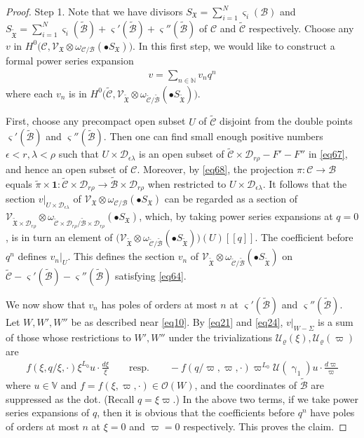 \documentclass[12pt,a4paper,notitlepage]{article}
\theoremstyle{definition}
\theoremstyle{plain}
\newcommand{\fk}{\mathfrak}
\newcommand{\mc}{\mathcal}
\newcommand{\wtd}{\widetilde}
\newcommand{\id}{\mathbf{1}}
\newcommand{\scr}{\mathscr}
\newcommand{\sgm}{\varsigma}
\newcommand{\blt}{\bullet}
\newcommand{\Vbb}{\mathbb V}
\newcommand{\Nbb}{\mathbb N}
\numberwithin{equation}{section}
\begin{document}
\begin{proof}
	Step 1. Note that we have divisors $S_{\fk X}=\sum_{i=1}^N\sgm_i(\mc B)$ and $S_{\wtd{\fk X}}=\sum_{i=1}^N\sgm_i(\wtd{\mc B})+\sgm'(\wtd{\mc B})+\sgm''(\wtd{\mc B})$ of $\mc C$ and $\wtd{\mc C}$ respectively. Choose any $v$ in $H^0\big(\mc C,\scr V_{\fk X}\otimes\omega_{\mc C/\mc B}(\blt S_{\fk X})\big)$.  In this first step, we would like to construct a formal power series expansion
	\begin{align}
	v=\sum_{n\in\Nbb}v_{n}q^n\label{eq64}
	\end{align}
	where each $v_{n}$ is in $H^0\big(\wtd{\mc C},\scr V_{\wtd{\fk X}}\otimes\omega_{\wtd{\mc C}/\wtd{\mc B}}(\blt S_{\wtd{\fk X}})\big)$.  
	
	First, choose any precompact open subset $U$ of $\wtd{\mc C}$ disjoint from the double points $\sgm'(\wtd{\mc B})$ and $\sgm''(\wtd{\mc B})$. Then  one can find small enough positive numbers $\epsilon<r,\lambda<\rho$  such that $U\times\mc D_{\epsilon\lambda}$ is an open subset of  $\wtd {\mc C}\times\mc D_{r\rho}- F'-F''$ in \eqref{eq67}, and hence an open subset of $\mc C$.   Moreover, by \eqref{eq68}, the projection $\pi:\mc C\rightarrow\mc B$ equals $\wtd \pi\times \id:\wtd {\mc C}\times\mc D_{r\rho}\rightarrow \wtd{\mc B}\times \mc D_{r\rho}$ when restricted to  $U\times \mc D_{\epsilon\lambda}$. It follows that the section $v|_{U\times \mc D_{\epsilon\lambda}}$  of $\scr V_{\fk X}\otimes\omega_{\mc C/\mc B}(\blt S_{\fk X})$ can be regarded as a section of $\scr V_{\wtd{\fk X}\times\mc D_{r\rho}}\otimes\omega_{\wtd{\mc C}\times\mc D_{r\rho}/\wtd{\mc B}\times\mc D_{r\rho}}(\blt S_{\fk X})$, which, by taking power series expansions at $q=0$, is in turn an element of $\big(\scr V_{\wtd{\fk X}}\otimes\omega_{\wtd{\mc C}/\wtd{\mc B}}(\blt S_{\wtd{\fk X}})\big)(U)[[q]]$. The coefficient before $q^{n}$ defines $v_{n}|_{U}$. This defines the section $v_{n}$ of $\scr V_{\wtd{\fk X}}\otimes\omega_{\wtd{\mc C}/\wtd{\mc B}}(\blt S_{\wtd{\fk X}})$ on $\wtd{\mc C}-\sgm'(\wtd{\mc B})- \sgm''(\wtd{\mc B})$ satisfying \eqref{eq64}.
	
	We now show that $v_{n}$ has poles of orders at most $n$ at $\sgm'(\wtd{\mc B})$ and $\sgm''(\wtd{\mc B})$. Let $W,W',W''$ be as described near \eqref{eq10}. By \eqref{eq21} and \eqref{eq24}, $v|_{W-\Sigma}$ is a sum of those whose restrictions to $W',W''$  under the trivializations $\mc U_\varrho(\xi),\mc U_\varrho(\varpi)$ are
	\begin{align}
	f(\xi,q/\xi,\cdot)\xi^{L_0}u\cdot \frac{d\xi}{\xi}  \qquad\text{resp.}\qquad -f(q/\varpi,\varpi,\cdot)\varpi^{L_0}\mc U(\upgamma_1)u\cdot \frac{d\varpi}{\varpi}\label{eq65}
	\end{align}
	where $u\in\Vbb$ and $f=f(\xi,\varpi,\cdot)\in\scr O(W)$, and the coordinates of $\wtd {\mc B}$ are suppressed as the dot. (Recall $q=\xi\varpi$.) In the above two terms, if we take power series expansions of $q$, then it is obvious that the coefficients before  $q^{n}$ have poles of orders at most $n$ at $\xi=0$ and $\varpi=0$ respectively. This proves the claim.
	

\end{proof}
\end{document}
